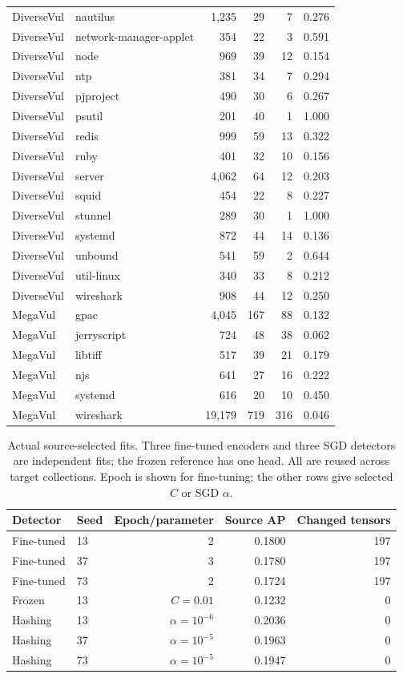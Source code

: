 \begin{longtable}{@{}llrrrr@{}}
DiverseVul & nautilus & 1,235 & 29 & 7 & 0.276\\
DiverseVul & network-manager-applet & 354 & 22 & 3 & 0.591\\
DiverseVul & node & 969 & 39 & 12 & 0.154\\
DiverseVul & ntp & 381 & 34 & 7 & 0.294\\
DiverseVul & pjproject & 490 & 30 & 6 & 0.267\\
DiverseVul & psutil & 201 & 40 & 1 & 1.000\\
DiverseVul & redis & 999 & 59 & 13 & 0.322\\
DiverseVul & ruby & 401 & 32 & 10 & 0.156\\
DiverseVul & server & 4,062 & 64 & 12 & 0.203\\
DiverseVul & squid & 454 & 22 & 8 & 0.227\\
DiverseVul & stunnel & 289 & 30 & 1 & 1.000\\
DiverseVul & systemd & 872 & 44 & 14 & 0.136\\
DiverseVul & unbound & 541 & 59 & 2 & 0.644\\
DiverseVul & util-linux & 340 & 33 & 8 & 0.212\\
DiverseVul & wireshark & 908 & 44 & 12 & 0.250\\
MegaVul & gpac & 4,045 & 167 & 88 & 0.132\\
MegaVul & jerryscript & 724 & 48 & 38 & 0.062\\
MegaVul & libtiff & 517 & 39 & 21 & 0.179\\
MegaVul & njs & 641 & 27 & 16 & 0.222\\
MegaVul & systemd & 616 & 20 & 10 & 0.450\\
MegaVul & wireshark & 19,179 & 719 & 316 & 0.046\\
\end{longtable}

\begin{table}[htbp]\centering\small
\caption{Actual source-selected fits. Three fine-tuned encoders and three SGD detectors are independent fits; the frozen reference has one head. All are reused across target collections. Epoch is shown for fine-tuning; the other rows give selected $C$ or SGD $\alpha$.}
\label{si:newfits}\begin{tabular}{@{}llrrr@{}}\toprule Detector & Seed & Epoch/parameter & Source AP & Changed tensors\\\midrule
Fine-tuned & 13 & 2 & 0.1800 & 197\\
Fine-tuned & 37 & 3 & 0.1780 & 197\\
Fine-tuned & 73 & 2 & 0.1724 & 197\\
Frozen & 13 & $C=0.01$ & 0.1232 & 0\\
Hashing & 13 & $\alpha=10^{-6}$ & 0.2036 & 0\\
Hashing & 37 & $\alpha=10^{-5}$ & 0.1963 & 0\\
Hashing & 73 & $\alpha=10^{-5}$ & 0.1947 & 0\\
\bottomrule\end{tabular}\end{table}

